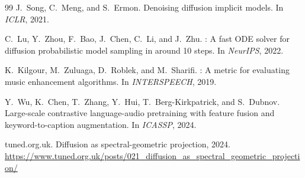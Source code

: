 \documentclass[12pt,a4paper]{article}
\begin{document}
\begin{thebibliography}{99}
J.\ Song, C.\ Meng, and S.\ Ermon.
\newblock Denoising diffusion implicit models.
\newblock In \textit{ICLR}, 2021.

C.\ Lu, Y.\ Zhou, F.\ Bao, J.\ Chen, C.\ Li, and J.\ Zhu.
: A fast ODE solver for diffusion probabilistic
model sampling in around 10 steps.
\newblock In \textit{NeurIPS}, 2022.

K.\ Kilgour, M.\ Zuluaga, D.\ Roblek, and M.\ Sharifi.
: A metric for evaluating music
enhancement algorithms.
\newblock In \textit{INTERSPEECH}, 2019.

Y.\ Wu, K.\ Chen, T.\ Zhang, Y.\ Hui, T.\ Berg-Kirkpatrick, and
S.\ Dubnov.
\newblock Large-scale contrastive language-audio pretraining with
feature fusion and keyword-to-caption augmentation.
\newblock In \textit{ICASSP}, 2024.

tuned.org.uk.
\newblock Diffusion as spectral-geometric projection, 2024.
\newblock \url{https://www.tuned.org.uk/posts/021_diffusion_as_spectral_geometric_projection/}

\end{thebibliography}
\end{document}

